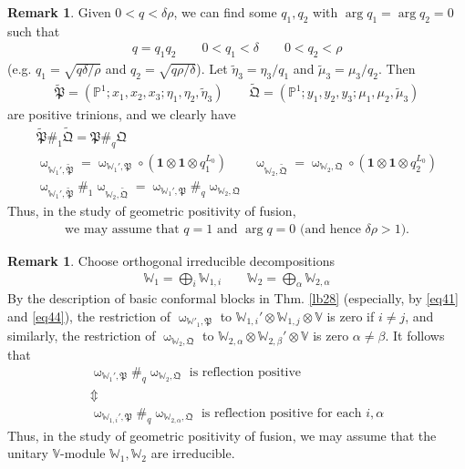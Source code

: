\documentclass[11pt,b5paper,notitlepage]{article}
\theoremstyle{definition}
\newtheorem{rem}[df]{Remark}
\theoremstyle{plain}
\newcommand{\fk}{\mathfrak}
\newcommand{\wtd}{\widetilde}
\newcommand{\id}{\mathbf{1}}
\newcommand{\Vbb}{\mathbb V}
\newcommand{\Wbb}{\mathbb W}
\newcommand{\Pbb}{\mathbb P}
\numberwithin{equation}{section}
\begin{document}
\begin{rem}\label{lb36}
Given $0<q<\delta\rho$, we can find some $q_1,q_2$ with $\arg q_1=\arg q_2=0$ such that
\begin{gather*}
q=q_1q_2\qquad 0<q_1<\delta\qquad 0<q_2<\rho
\end{gather*}
(e.g. $q_1=\sqrt{q\delta/\rho}$ and $q_2=\sqrt{q\rho/\delta}$). Let $\wtd\eta_3=\eta_3/q_1$ and $\wtd\mu_3=\mu_3/q_2$. Then
\begin{align*}
\wtd{\fk P}=(\Pbb^1;x_1,x_2,x_3;\eta_1,\eta_2,\wtd\eta_3)\qquad \wtd{\fk Q}=(\Pbb^1;y_1,y_2,y_3;\mu_1,\mu_2,\wtd\mu_3)
\end{align*}
are positive trinions, and we clearly have
\begin{gather*}
\wtd{\fk P}\#_1\wtd{\fk Q}=\fk P\#_q\fk Q\\
\upomega_{\Wbb_1',\wtd{\fk P}}=\upomega_{\Wbb_1',\fk P}\circ(\id\otimes\id\otimes q_1^{L_0})\qquad \upomega_{\Wbb_2,\wtd{\fk Q}}=\upomega_{\Wbb_2,\fk Q}\circ(\id\otimes\id\otimes q_2^{L_0})\\
\upomega_{\Wbb_1',\wtd{\fk P}}\#_1\upomega_{\Wbb_2,\wtd{\fk Q}}=\upomega_{\Wbb_1',\fk P}\#_q\upomega_{\Wbb_2,\fk Q}
\end{gather*}
Thus, in the study of geometric positivity of fusion, 
\begin{align*}
\text{we may assume that $q=1$ and $\arg q=0$ (and hence $\delta\rho>1$).}
\end{align*}
\end{rem}


\begin{rem}\label{lb41}
Choose orthogonal irreducible decompositions
\begin{align}
\Wbb_1=\bigoplus_i \Wbb_{1,i}\qquad \Wbb_2=\bigoplus_\alpha \Wbb_{2,\alpha} \label{eq75}
\end{align}
By the description of basic conformal blocks in Thm. \ref{lb28} (especially, by \eqref{eq41} and \eqref{eq44}), the restriction of $\upomega_{\Wbb'_1,\fk P}$ to $\Wbb_{1,i}'\otimes\Wbb_{1,j}\otimes\Vbb$ is zero if $i\neq j$, and similarly, the restriction of $\upomega_{\Wbb_2,\fk Q}$ to $\Wbb_{2,\alpha}\otimes\Wbb_{2,\beta}'\otimes\Vbb$ is zero $\alpha\neq\beta$. It follows that
\begin{gather*}
\upomega_{\Wbb_1',\fk P}\#_q\upomega_{\Wbb_2,\fk Q}\text{ is reflection positive}\\
\Updownarrow\\
\upomega_{\Wbb_{1,i}',\fk P}\#_q\upomega_{\Wbb_{2,\alpha},\fk Q}\text{ is reflection positive for each }i,\alpha
\end{gather*}
Thus, in the study of geometric positivity of fusion, we may assume that the unitary $\Vbb$-module $\Wbb_1,\Wbb_2$ are irreducible.
\end{rem}
\end{document}

